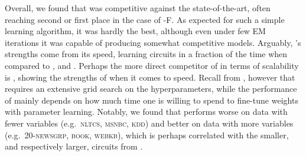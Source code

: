 Overall, we found that  was competitive against the state-of-the-art, often
reaching second or first place in the case of -F. As expected for such a simple
learning algorithm, it was hardly the best, although even under few EM iterations it was capable of
producing somewhat competitive models. Arguably, 's strengths come from its
speed, learning circuits in a fraction of the time when compared to ,
 and . Perhaps the more direct competitor of
 in terms of scalability is , showing the strengths of \randclass{}
when it comes to speed. Recall from , however that  requires an
extensive grid search on the hyperparameters, while the performance of  mainly
depends on how much time one is willing to spend to fine-tune weights with parameter learning.
Notably, we found that  performs worse on data with fewer variables (e.g.\
\textsc{nltcs}, \textsc{msnbc}, \textsc{kdd}) and better on data with more variables (e.g.\
\textsc{20-newsgrp}, \textsc{book}, \textsc{webkb}), which is perhaps correlated with the smaller,
and respectively larger, circuits from \Cref{tab:binsize}.

